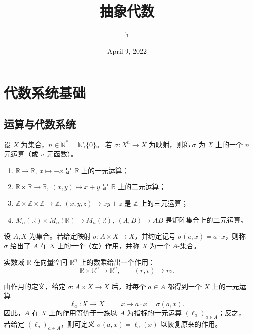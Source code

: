 \documentclass[lang=cn,a4paper,newtx]{elegantbook}
\title{抽象代数}
\author{h}
\date{April 9, 2022}
\begin{document}
\maketitle
\frontmatter

\tableofcontents

\mainmatter

\chapter{代数系统基础}

\section{运算与代数系统}

\begin{definition}[$n$ 元运算]
设 $X$ 为集合，$n\in\mathbb N^{*}=\mathbb N\setminus\{0\}$。
若 $\sigma:X^{n}\to X$ 为映射，则称 $\sigma$ 为 $X$ 上的一个 $n$ 元运算（或 $n$ 元函数）。
\end{definition}

\begin{example}
\leavevmode
\begin{enumerate}
  \item $\mathbb R\to\mathbb R,\ x\mapsto -x$ 是 $\mathbb R$ 上的一元运算；
  \item $\mathbb R\times\mathbb R\to\mathbb R,\ (x,y)\mapsto x+y$ 是 $\mathbb R$ 上的二元运算；
  \item $\mathbb Z\times\mathbb Z\times\mathbb Z\to\mathbb Z,\ (x,y,z)\mapsto xy+z$ 是 $\mathbb Z$ 上的三元运算；
  \item $M_n(\mathbb R)\times M_n(\mathbb R)\to M_n(\mathbb R),\ (A,B)\mapsto AB$ 是矩阵集合上的二元运算。
\end{enumerate}
\end{example}

\begin{definition}[作用]
设 $A,X$ 为集合。若给定映射 $\sigma:A\times X\to X$，并约定记号 $\sigma(a,x)=a\cdot x$，则称 $\sigma$ 给出了 $A$ 在 $X$ 上的一个（左）作用，并称 $X$ 为一个 $A$-集合。
\end{definition}

\begin{example}
实数域 $\mathbb R$ 在向量空间 $\mathbb R^n$ 上的数乘给出一个作用：
\[
  \mathbb R\times\mathbb R^n\to\mathbb R^n,\qquad (r,v)\mapsto rv.
\]
\end{example}

\noindent 由作用的定义，给定 $\sigma:A\times X\to X$ 后，对每个 $a\in A$ 都得到一个 $X$ 上的一元运算
\[
  \ell_a:X\to X,\qquad x\mapsto a\cdot x=\sigma(a,x).
\]
因此，$A$ 在 $X$ 上的作用等价于一族以 $A$ 为指标的一元运算 $(\ell_a)_{a\in A}$；反之，若给定 $(\ell_a)_{a\in A}$，则可定义 $\sigma(a,x)=\ell_a(x)$ 以恢复原来的作用。
\end{document}
